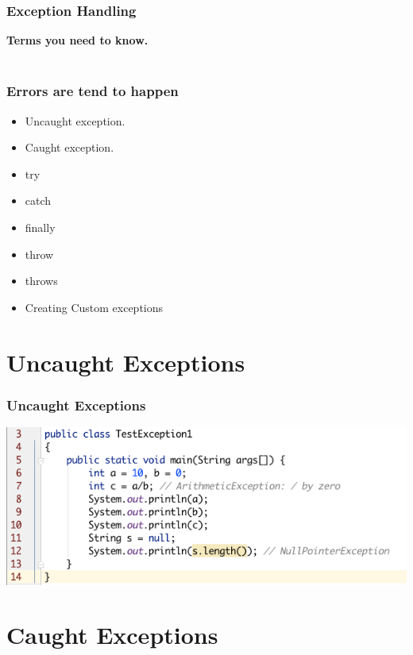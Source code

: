 \documentclass{beamer}
\begin{document}
\begin{frame}
\frametitle{Exception Handling}
\textbf{Terms you need to know.}\\~\\
\frametitle{Errors are tend to happen}
\begin{itemize}
\item Uncaught exception.
\item Caught exception.
\item try
\item catch
\item finally
\item throw
\item throws
\item Creating Custom exceptions
\end{itemize}
\end{frame}

\section{Uncaught Exceptions}

\begin{frame}
\frametitle{Uncaught Exceptions}
\includegraphics[width=\textwidth]{UncaughtException.png}
\end{frame}


\section{Caught Exceptions}
\end{document}
